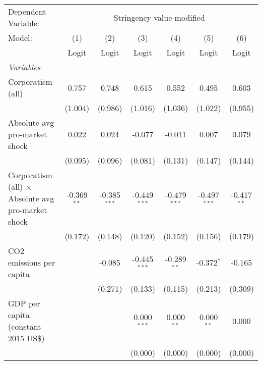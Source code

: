 
\begingroup
\centering
\begin{tabular}{lcccccc}
   \toprule
   Dependent Variable: & \multicolumn{6}{c}{Stringency value modified}\\
   Model:                                                    & (1)           & (2)            & (3)            & (4)            & (5)            & (6)\\  
                                                             &  Logit        & Logit          & Logit          & Logit          & Logit          & Logit\\  
   \midrule
   \emph{Variables}\\
   Corporatism (all)                                         & 0.757         & 0.748          & 0.615          & 0.552          & 0.495          & 0.603\\   
                                                             & (1.004)       & (0.986)        & (1.016)        & (1.036)        & (1.022)        & (0.955)\\   
   Absolute avg pro-market shock                             & 0.022         & 0.024          & -0.077         & -0.011         & 0.007          & 0.079\\   
                                                             & (0.095)       & (0.096)        & (0.081)        & (0.131)        & (0.147)        & (0.144)\\   
   Corporatism (all) $\times$ Absolute avg pro-market shock  & -0.369$^{**}$ & -0.385$^{***}$ & -0.449$^{***}$ & -0.479$^{***}$ & -0.497$^{***}$ & -0.417$^{**}$\\   
                                                             & (0.172)       & (0.148)        & (0.120)        & (0.152)        & (0.156)        & (0.179)\\   
   CO2 emissions per capita                                  &               & -0.085         & -0.445$^{***}$ & -0.289$^{**}$  & -0.372$^{*}$   & -0.165\\   
                                                             &               & (0.271)        & (0.133)        & (0.115)        & (0.213)        & (0.309)\\   
   GDP per capita (constant 2015 US\$)                       &               &                & 0.000$^{***}$  & 0.000$^{**}$   & 0.000$^{**}$   & 0.000\\   
                                                             &               &                & (0.000)        & (0.000)        & (0.000)        & (0.000)\\   

\end{tabular}
